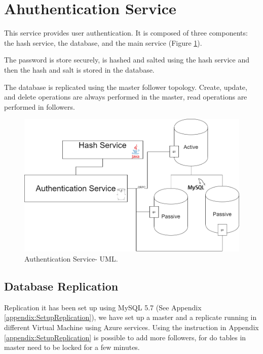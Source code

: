 \section{Ahuthentication Service}



\indent
\indent
This service provides user authentication. It is composed of three components: the hash service, the database, and the main service (Figure \ref{auth:xxdfdfdfdf}).

The password is store securely, is hashed and salted using the hash service and then the hash and salt is stored in the database.

The database is replicated using the master follower topology. Create, update, and delete operations are always performed in the master, read operations are performed in followers. 

\begin{figure}[H]
\begin{center}
\includegraphics[width=120mm,scale=1]{img/auth/auth-main-uml.png}
\caption{Authentication Service- UML.}
\label{auth:xxdfdfdfdf}
\end{center}

\end{figure}


\subsection{Database Replication}

\indent
\indent
Replication it has been set up using MySQL 5.7 (See Appendix \ref{appendix:SetupReplication}),  we have set up a master and a replicate running in different Virtual Machine using Azure services. Using the instruction in Appendix \ref{appendix:SetupReplication} is possible to add more followers, for do tables in master need to be locked for a few minutes.


